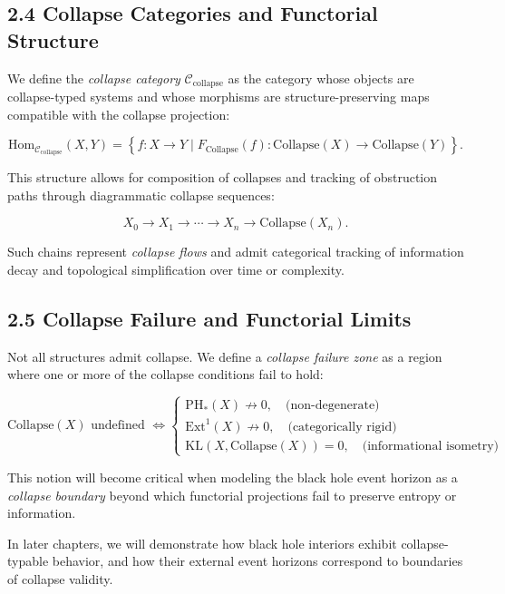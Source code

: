 \documentclass[11pt]{article}
\begin{document}
\subsection*{2.4 Collapse Categories and Functorial Structure}

We define the \textit{collapse category} \( \mathcal{C}_{\mathrm{collapse}} \) as the category whose objects are collapse-typed systems and whose morphisms are structure-preserving maps compatible with the collapse projection:

\[
\mathrm{Hom}_{\mathcal{C}_{\mathrm{collapse}}}(X,Y) = 
\left\{ f : X \rightarrow Y \mid F_{\mathrm{Collapse}}(f) : \mathrm{Collapse}(X) \rightarrow \mathrm{Collapse}(Y) \right\}.
\]

This structure allows for composition of collapses and tracking of obstruction paths through diagrammatic collapse sequences:

\[
X_0 \rightarrow X_1 \rightarrow \cdots \rightarrow X_n \rightarrow \mathrm{Collapse}(X_n).
\]

Such chains represent \textit{collapse flows} and admit categorical tracking of information decay and topological simplification over time or complexity.

\subsection*{2.5 Collapse Failure and Functorial Limits}

Not all structures admit collapse. We define a \textit{collapse failure zone} as a region where one or more of the collapse conditions fail to hold:

\[
\mathrm{Collapse}(X) \text{ undefined } \iff
\begin{cases}
\mathrm{PH}_*(X) \not\rightarrow 0, \quad \text{(non-degenerate)} \\
\mathrm{Ext}^1(X) \not\rightarrow 0, \quad \text{(categorically rigid)} \\
\mathrm{KL}(X, \mathrm{Collapse}(X)) = 0, \quad \text{(informational isometry)}
\end{cases}
\]

This notion will become critical when modeling the black hole event horizon as a \textit{collapse boundary} beyond which functorial projections fail to preserve entropy or information.

In later chapters, we will demonstrate how black hole interiors exhibit collapse-typable behavior, and how their external event horizons correspond to boundaries of collapse validity.
\end{document}
